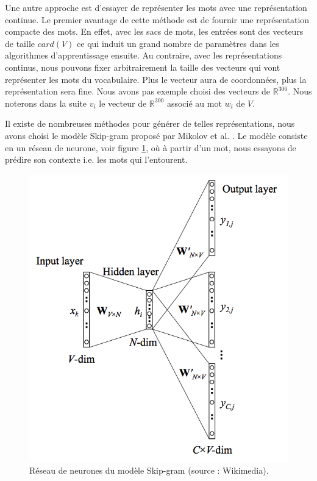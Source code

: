 \documentclass{article}
\begin{document}
Une autre approche est d'essayer de représenter les mots avec une représentation continue. Le premier avantage de cette méthode est de fournir une représentation compacte des mots. En effet, avec les sacs de mots, les entrées sont des vecteurs de taille $card(V)$ ce qui induit un grand nombre de paramètres dans les algorithmes d'apprentissage ensuite. Au contraire, avec les représentations continus, nous pouvons fixer arbitrairement la taille des vecteurs qui vont représenter les mots du vocabulaire. Plus le vecteur aura de coordonnées, plus la représentation sera fine. Nous avons pas exemple choisi des vecteurs de $\mathbb{R}^{300}$. Nous noterons dans la suite $v_{i}$ le vecteur de $\mathbb{R}^{300}$ associé au mot $w_{i}$ de $V$.

Il existe de nombreuses méthodes pour générer de telles représentations, nous avons choisi le modèle Skip-gram proposé par Mikolov et al. \cite{mikolov2013efficient} \cite{mikolov2013distributed}. Le modèle consiste en un réseau de neurone, voir figure \ref{skip_gram}, où à partir d'un mot, nous essayons de prédire son contexte i.e. les mots qui l'entourent.

\begin{figure}[h]
\begin{center}
\includegraphics{images/skip_gram.png}
\caption{Réseau de neurones du modèle Skip-gram (source : Wikimedia).}
\label{skip_gram}
\end{center}
\end{figure}
\end{document}
